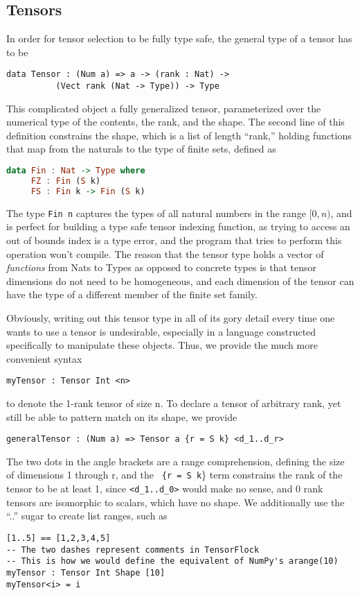 \documentclass[12pt]{article}
\begin{document}
\subsection{Tensors}
In order for tensor selection to be fully type safe, the general type of a tensor has to be
\begin{lstlisting}
data Tensor : (Num a) => a -> (rank : Nat) -> 
	      (Vect rank (Nat -> Type)) -> Type
\end{lstlisting}
This complicated object a fully generalized tensor, parameterized over the numerical type of the contents, the rank, and the shape. The second line of this definition constrains the shape, which is a list of length ``rank,'' holding functions that map from the naturals to the type of finite sets, defined as 
\begin{lstlisting}[language=Haskell]
data Fin : Nat -> Type where
     FZ : Fin (S k)
     FS : Fin k -> Fin (S k)
\end{lstlisting}
The type \lstinline{Fin n}
captures the types of all natural numbers in the range $[0,n)$, and is perfect for building a type safe tensor indexing function, as trying to access an out of bounds index is a type error, and the program that tries to perform this operation won't compile. The reason that the tensor type holds a vector of \textit{functions} from Nats to Types as opposed to concrete types is that tensor dimensions do not need to be homogeneous, and each dimension of the tensor can have the type of a different member of the finite set family. 

Obviously, writing out this tensor type in all of its gory detail every time one wants to use a tensor is undesirable, especially in a language constructed specifically to manipulate these objects. Thus, we provide the much more convenient syntax 
\begin{lstlisting}
myTensor : Tensor Int <n>
\end{lstlisting}
to denote the 1-rank tensor of size n. To declare a tensor of arbitrary rank, yet still be able to pattern match on its shape, we provide
\begin{lstlisting}
generalTensor : (Num a) => Tensor a {r = S k} <d_1..d_r>
\end{lstlisting}
The two dots in the angle brackets are a range comprehension, defining the size of dimensions 1 through r, and the \lstinline{ {r = S k}\} term constrains the rank of the tensor to be at least 1, since 
\lstinline{<d_1..d_0>} would make no sense, and 0 rank tensors are isomorphic to scalars, which have no shape. We additionally use the ``..'' sugar to create list ranges, such as 
\begin{lstlisting}
[1..5] == [1,2,3,4,5]
-- The two dashes represent comments in TensorFlock
-- This is how we would define the equivalent of NumPy's arange(10)
myTensor : Tensor Int Shape [10]
myTensor<i> = i 
\end{lstlisting}
\end{document}

